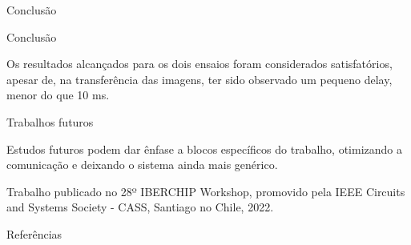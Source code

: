 \documentclass[10pt]{beamer}
\begin{document}
\begin{frame}{Conclusão}
	\begin{alertblock}{Conclusão}
		\vspace{0.1cm}
		\begin{justify}
			Os resultados alcançados para os dois ensaios foram considerados satisfatórios, apesar de, na transferência das imagens, ter sido observado um pequeno delay, menor do que 10 ms.
		\end{justify}
	\end{alertblock}
	\begin{alertblock}{Trabalhos futuros}
		\vspace{0.1cm}
	    \begin{justify}
			Estudos futuros podem dar ênfase a blocos específicos do trabalho, otimizando a comunicação e deixando o sistema ainda mais genérico.
	    \end{justify}
	\end{alertblock}
	\vspace{0.4cm}
	{\small Trabalho publicado no 28º IBERCHIP Workshop, promovido pela IEEE Circuits and Systems Society - CASS, Santiago no Chile, 2022.}
\end{frame}






\begin{frame}[allowframebreaks]{Referências}
  
  
\end{frame}
\end{document}

